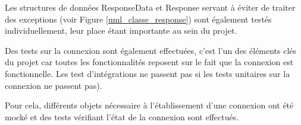 \medbreak

Les structures de données ResponseData et Response servant à éviter de traiter des exceptions (voir Figure  \ref{uml_classe_response}) sont également testés individuellement, leur place étant importante au sein du projet.

\bigbreak
Des tests sur la connexion sont également effectuées, c'est l'un des éléments clés du projet car toutes les fonctionnalités reposent sur le fait que la connexion est fonctionnelle. Les test d'intégrations ne passent pas si les tests unitaires sur la connexion ne passent pas).

Pour cela, différents objets nécessaire à l'établissement d'une connexion ont été mocké et des tests vérifiant l'état de la connexion sont effectués.

